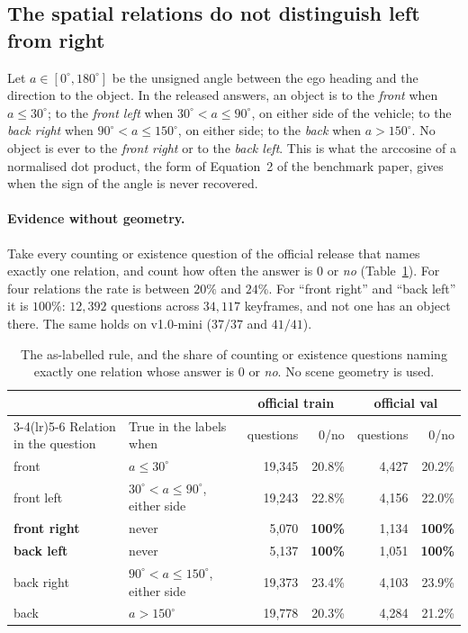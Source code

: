 \documentclass[11pt,a4paper]{article}
\begin{document}
\subsection{The spatial relations do not distinguish left from right}
\label{sec:leftright}

Let $a \in [0^{\circ}, 180^{\circ}]$ be the unsigned angle between the ego
heading and the direction to the object. In the released answers, an object
is to the \emph{front} when $a \le 30^{\circ}$; to the \emph{front left} when
$30^{\circ} < a \le 90^{\circ}$, on either side of the vehicle; to the
\emph{back right} when $90^{\circ} < a \le 150^{\circ}$, on either side; to
the \emph{back} when $a > 150^{\circ}$. No object is ever to the \emph{front
right} or to the \emph{back left}. This is what the arccosine of a normalised
dot product, the form of Equation~2 of the benchmark paper, gives when the
sign of the angle is never recovered.

\paragraph{Evidence without geometry.} Take every counting or existence
question of the official release that names exactly one relation, and count
how often the answer is $0$ or \emph{no} (Table~\ref{tab:nogeom}). For four
relations the rate is between $20\%$ and $24\%$. For ``front right'' and
``back left'' it is $100\%$: $12{,}392$ questions across $34{,}117$
keyframes, and not one has an object there. The same holds on v1.0-mini
($37/37$ and $41/41$). 

\begin{table}[ht]
\centering
\small
\begin{tabular}{llrrrr}
\toprule
 & & \multicolumn{2}{c}{official train} & \multicolumn{2}{c}{official val} \\
\cmidrule(lr){3-4}\cmidrule(lr){5-6}
Relation in the question & True in the labels when & questions & $0$/no & questions & $0$/no \\
\midrule
front                & $a \le 30^{\circ}$                       & 19,345 & 20.8\% & 4,427 & 20.2\% \\
front left           & $30^{\circ} < a \le 90^{\circ}$, either side  & 19,243 & 22.8\% & 4,156 & 22.0\% \\
\textbf{front right} & never                                    & 5,070  & \textbf{100\%} & 1,134 & \textbf{100\%} \\
\textbf{back left}   & never                                    & 5,137  & \textbf{100\%} & 1,051 & \textbf{100\%} \\
back right           & $90^{\circ} < a \le 150^{\circ}$, either side & 19,373 & 23.4\% & 4,103 & 23.9\% \\
back                 & $a > 150^{\circ}$                        & 19,778 & 20.3\% & 4,284 & 21.2\% \\
\bottomrule
\end{tabular}
\caption{The as-labelled rule, and the share of counting or existence
questions naming exactly one relation whose answer is $0$ or \emph{no}. No
scene geometry is used.}
\label{tab:nogeom}
\end{table}
\end{document}
